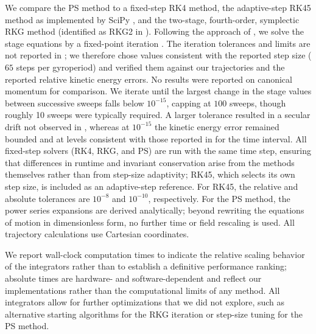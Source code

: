 \documentclass{article}
\begin{document}
We compare the PS method to a fixed-step RK4 method, the adaptive-step RK45 method \cite{Dormand1980} as implemented by SciPy \cite{scipy}, and the two-stage, fourth-order, symplectic RKG method (identified as RKG2 in \cite{Yugo2007}). Following the approach of \cite{Yugo2007}, we solve the stage equations by a fixed-point iteration \cite{Calvo2003}. The iteration tolerances and limits are not reported in \cite{Yugo2001, Yugo2007}; we therefore chose values consistent with the reported step size ($65$ steps per gyroperiod) and verified them against our trajectories and the reported relative kinetic energy errors. No results were reported on canonical momentum for comparison. We iterate until the largest change in the stage values between successive sweeps falls below $10^{-15}$, capping at $100$ sweeps, though roughly 10 sweeps were typically required. A larger tolerance resulted in a secular drift not observed in \cite{Yugo2007}, whereas at $10^{-15}$ the kinetic energy error remained bounded and at levels consistent with those reported in \cite{Yugo2007} for the time interval. All fixed-step solvers (RK4, RKG, and PS) are run with the same time step, ensuring that differences in runtime and invariant conservation arise from the methods themselves rather than from step-size adaptivity; RK45, which selects its own step size, is included as an adaptive-step reference. For RK45, the relative and absolute tolerances are $10^{-8}$ and $10^{-10}$, respectively. For the PS method, the power series expansions are derived analytically; beyond rewriting the equations of motion in dimensionless form, no further time or field rescaling is used. All trajectory calculations use Cartesian coordinates.


We report wall-clock computation times to indicate the relative scaling behavior of the integrators rather than to establish a definitive performance ranking; absolute times are hardware- and software-dependent and reflect our implementations rather than the computational limits of any method. All integrators allow for further optimizations that we did not explore, such as alternative starting algorithms for the RKG iteration or step-size tuning for the PS method.
\end{document}

